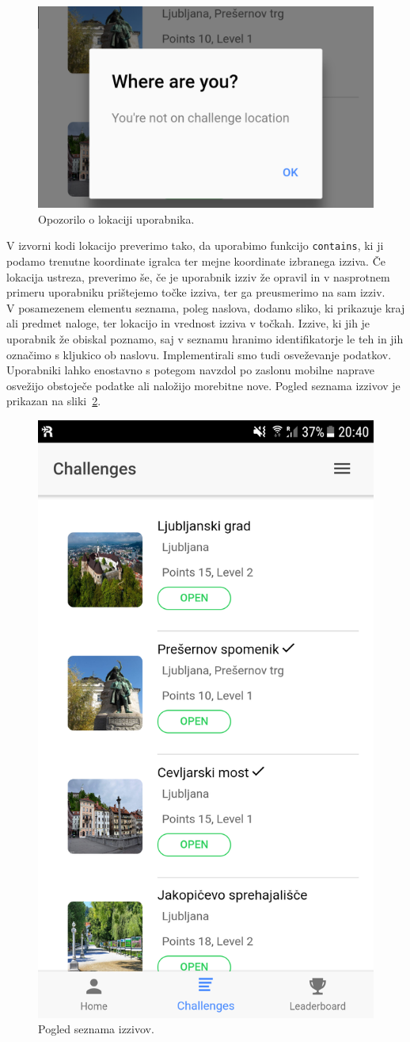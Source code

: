 \documentclass[a4paper, 12pt]{book}
\begin{document}
\begin{figure}[H]
\centering
\includegraphics[height=0.4\textwidth]{slike/where}
\caption{Opozorilo o lokaciji uporabnika.}\label{where}
\end{figure}
\noindent V izvorni kodi lokacijo preverimo tako, da uporabimo funkcijo \texttt{contains}, ki ji podamo trenutne koordinate igralca ter mejne koordinate izbranega izziva. Če lokacija ustreza, preverimo še, če je uporabnik izziv že opravil in v nasprotnem primeru uporabniku prištejemo točke izziva, ter ga preusmerimo na sam izziv.\\V posamezenem elementu seznama, poleg naslova, dodamo sliko, ki prikazuje kraj ali predmet naloge, ter lokacijo in vrednost izziva v točkah. Izzive, ki jih je uporabnik že obiskal poznamo, saj v seznamu hranimo identifikatorje le teh in jih označimo s kljukico ob naslovu. Implementirali smo tudi osveževanje podatkov. Uporabniki lahko enostavno s potegom navzdol po zaslonu mobilne naprave osvežijo obstoječe podatke ali naložijo morebitne nove. Pogled seznama izzivov je prikazan na sliki~\ref{izzivi}.
\begin{figure}[H]
\centering
\includegraphics[height=0.8\textwidth]{slike/izzivi}
\caption{Pogled seznama izzivov.}\label{izzivi}
\end{figure}
\end{document}
